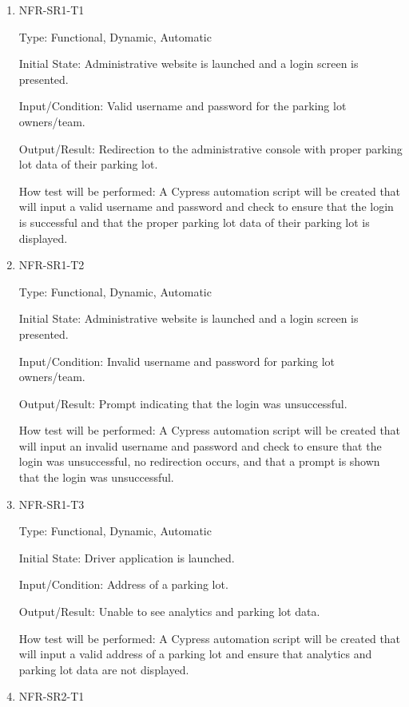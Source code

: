 \documentclass[12pt, titlepage]{article}
\begin{document}
\begin{enumerate}
\item{NFR-SR1-T1}

Type: Functional, Dynamic, Automatic
					
Initial State: Administrative website is launched and a login screen is
presented.
					
Input/Condition: Valid username and password for the parking lot owners/team.
					
Output/Result: Redirection to the administrative console with proper parking lot
data of their parking lot.
					
How test will be performed: A Cypress automation script will be created that
will input a valid username and password and check to ensure that the login is
successful and that the proper parking lot data of their parking lot is
displayed.

\item{NFR-SR1-T2}

Type: Functional, Dynamic, Automatic
					
Initial State: Administrative website is launched and a login screen is
presented.
					
Input/Condition: Invalid username and password for parking lot owners/team.
					
Output/Result: Prompt indicating that the login was unsuccessful.
					
How test will be performed: A Cypress automation script will be created that
will input an invalid username and password and check to ensure that the login
was unsuccessful, no redirection occurs, and that a prompt is shown that the
login was unsuccessful.

\item{NFR-SR1-T3}

Type: Functional, Dynamic, Automatic
					
Initial State: Driver application is launched.
					
Input/Condition: Address of a parking lot.
					
Output/Result: Unable to see analytics and parking lot data.
					
How test will be performed: A Cypress automation script will be created that
will input a valid address of a parking lot and ensure that analytics and
parking lot data are not displayed.

\item{NFR-SR2-T1}


\end{enumerate}
\end{document}

